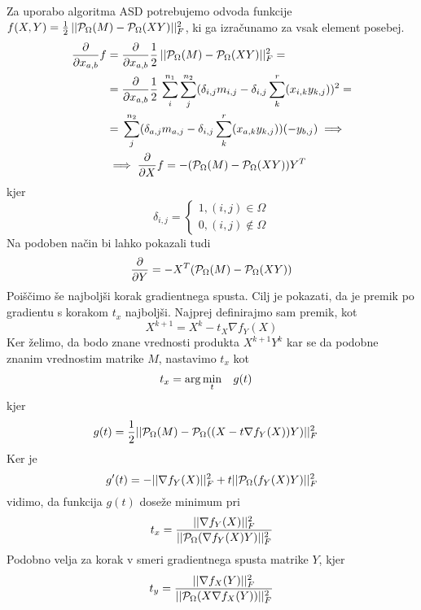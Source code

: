 Za uporabo algoritma ASD potrebujemo odvoda funkcije $f(X,Y) = \frac{1}{2}\, ||\mathcal{P}_\Omega(M) - \mathcal{P}_\Omega(XY)||^2_F$, ki ga izračunamo za vsak element posebej.
\begin{align*}
    \frac{\partial}{\partial x_{a,b}} f &= \frac{\partial}{\partial x_{a,b}} \frac{1}{2}\, ||\mathcal{P}_\Omega(M) - \mathcal{P}_\Omega(XY)||^2_F = \\
    &= \frac{\partial}{\partial x_{a,b}} \frac{1}{2}\, \sum_{i}^{n_1}\sum_{j}^{n_2}(\delta_{i,j}m_{i,j} - \delta_{i,j}\sum_{k}^{r}(x_{i,k}y_{k,j}))^2 = \\
    &= \, \sum_{j}^{n_2}(\delta_{a,j}m_{a,j} - \delta_{i,j}\sum_{k}^{r}(x_{a,k}y_{k,j}))(-y_{b,j}) \implies \\
    &\implies \frac{\partial}{\partial X}f = -(\mathcal{P}_\Omega(M) - \mathcal{P}_\Omega(XY))Y^T
\end{align*}
kjer 
\[
    \delta_{i,j} = \begin{cases}
        1, (i, j) \in \Omega \\
        0, (i, j) \notin \Omega
    \end{cases}
\]
Na podoben način bi lahko pokazali tudi
\[
    \frac{\partial}{\partial Y} = -X^T (\mathcal{P}_\Omega(M) - \mathcal{P}_\Omega(XY))
\]
Poiščimo še najboljši korak gradientnega spusta.
Cilj je pokazati, da je premik po gradientu s korakom $t_x$ najboljši.
Najprej definirajmo sam premik, kot
\[
    X^{k+1} = X^k - t_X \nabla f_Y(X)
\]
Ker želimo, da bodo znane vrednosti produkta $X^{k+1}Y^{k}$ kar se da podobne znanim vrednostim matrike $M$, nastavimo $t_x$ kot 
\begin{align*}
    t_x &= \arg \min_t \hspace{0.3cm} g(t)
\end{align*} kjer
\begin{align*}
    g(t) &= \frac{1}{2} ||\mathcal{P}_\Omega(M) - \mathcal{P}_\Omega((X - t\nabla f_Y(X))Y)||_F^2
\end{align*}
Ker je \cite{AST-TK15} 
\[
  g'(t) = -||\nabla f_Y(X)||_F^2 + t||\mathcal{P}_\Omega(f_Y(X)Y)||_F^2 
\]
vidimo, da funkcija $g(t)$ doseže minimum pri 
\[
  t_x = \frac{||\nabla f_Y(X)||_F^2}{||\mathcal{P}_\Omega(\nabla f_Y(X)Y)||_F^2}  
\]
Podobno velja za korak v smeri gradientnega spusta matrike $Y$, kjer
\[
  t_y = \frac{||\nabla f_X(Y)||_F^2}{||\mathcal{P}_\Omega(X \nabla f_X(Y))||_F^2}  
\]

